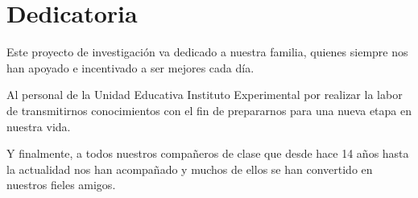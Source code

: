 {\setlength{\parskip}{-0.5cm}
\chapter*{Dedicatoria}


Este proyecto de investigación va dedicado a nuestra familia, quienes siempre nos han apoyado e incentivado a ser mejores cada día.
}

Al personal de la Unidad Educativa Instituto Experimental por realizar la labor de transmitirnos conocimientos con el fin de prepararnos para una nueva etapa en nuestra vida.

Y finalmente, a todos nuestros compañeros de clase que desde hace 14 años hasta la actualidad nos han acompañado y muchos de ellos se han convertido en nuestros fieles amigos. 

\newpage